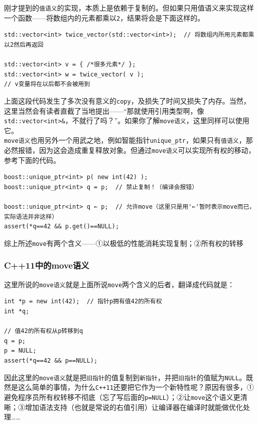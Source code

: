刚才提到的\texttt{值语义}的实现，本质上是依赖于复制的。但如果只用值语义来实现这样一个函数------将数组内的元素都乘以\texttt{2}，结果将会是下面这样的。

\begin{lstlisting}
std::vector<int> twice_vector(std::vector<int>);  // 将数组内所用元素都乘以2然后再返回

std::vector<int> v = { /*很多元素*/ };
std::vector<int> w = twice_vector( v ); 
// v变量将在以后都不会被用到
\end{lstlisting}

上面这段代码发生了多次没有意义的\texttt{copy}，及损失了时间又损失了内存。当然，这里当然会有读者直截了当地提出------``那就使用引用类型啊，像\texttt{std::vector\textless{}int\textgreater{}\&}，不就行了吗？''。如果你了解\texttt{move语义}，这里同样可以使用它。\\
\texttt{move语义}也用另外一个用武之地，例如智能指针\texttt{unique\_ptr}，如果只有\texttt{值语义}，那必然报错，因为这会造成重复释放对象。但通过\texttt{move语义}可以实现所有权的移动，参考下面的代码。

\begin{lstlisting}
boost::unique_ptr<int> p( new int(42) );
boost::unique_ptr<int> q = p;  // 禁止复制！（编译会报错）

boost::unique_ptr<int> q ← p;  // 允许move（这里只是用'←'暂时表示move而已，实际语法并非这样）
assert(*q==42 && p.get()==NULL);
\end{lstlisting}

综上所述\texttt{move}有两个含义------①以极低的性能消耗实现复制；②所有权的转移

\subsubsection[C++11中的move语义]{\texorpdfstring{\protect\hypertarget{14C11move_48}{}{}C++11中的move语义}{1.4.C++11中的move语义}}\label{c11ux4e2dux7684moveux8bedux4e49}

这里所说的\texttt{move语义}就是上面所说\texttt{move}两个含义的后者，翻译成代码就是：

\begin{lstlisting}
int *p = new int(42);  // 指针p拥有值42的所有权
int *q;

// 值42的所有权从p转移到q
q = p;
p = NULL;
assert(*q==42 && p==NULL);
\end{lstlisting}

因此这里的\texttt{move语义}就是把\texttt{旧指针}的值复制到\texttt{新指针}，并把\texttt{旧指针}的值赋为\texttt{NULL}。既然是这么简单的事情，为什么\texttt{C++11}还要把它作为一个新特性呢？原因有很多，①避免程序员所有权转移不彻底（忘了写后面的\texttt{p=NULL}）；②让\texttt{move}这个语义更清晰；③增加语法支持（也就是常说的右值引用）让编译器在编译时就能做优化处理\ldots{}\ldots{}

